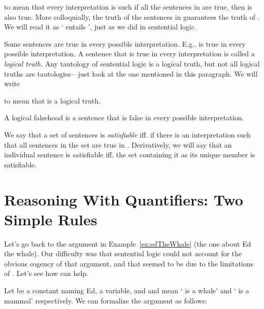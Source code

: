 \begin{center}

 \p{\Gamma \lentails \phi}

\end{center}

to mean that every interpretation is such if all the sentences in \p{\Gamma} are 
true, then \p{\phi} is also true. More colloquially, the truth of the sentences 
in \p{\Gamma} guarantees the truth of \p{\phi}.  We will read it as `\p{\Gamma} 
entails \p{\phi}', just as we did in sentential logic.

Some sentences are true in every possible interpretation. E.g., is true in every possible interpretation. A sentence that is 
true in every interpretation is called a \emph{logical truth}. Any tautology of 
sentential logic is a logical truth, but not all logical truths are 
tautologies---just look at the one mentioned in this paragraph. We will write

\begin{center}

 \p{ \lentails \phi} 

\end{center}

to mean that \p{\phi} is a logical truth. 

A logical falsehood is a sentence that is false in every possible 
interpretation.

We say that  a set of sentences is \emph{satisfiable} iff. if there is an 
interpretation \model{} such that all sentences in the set are true in \model.  
Derivatively, we will say that an individual sentence is satisfiable iff.  the 
set containing it as its unique member is satisfiable.




\section{Reasoning With Quantifiers: Two Simple Rules}\label{sec:
Quantifier-Reasoning}

Let's go back to the argument in Example~\ref{ex:edTheWhale} (the one about Ed 
the whale). Our difficulty was that sentential logic could not account for the 
obvious cogency of that argument, and that seemed to be due to the limitations 
of \lL{}. Let's see how \lL[Q]{} can help.

Let  be a constant naming Ed,  a variable, and  and  mean 
` is a whale' and ` is a mammal' respectively. We can formalize the 
argument as follows:

